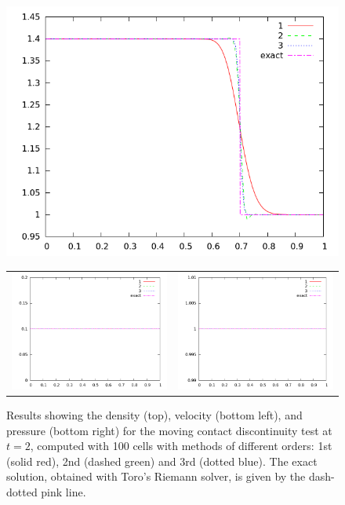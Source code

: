 \documentclass[10pt]{article}
\begin{document}
\begin{figure}[h]
  \begin{center}
     \includegraphics[width=.95\textwidth]{den_T8.png}
	\begin{tabular}{cc}
      \includegraphics[width=.475\textwidth]{vel_T8.png} &
	  \includegraphics[width=.475\textwidth]{prs_T8.png}
	\end{tabular}
  \end{center}
  \caption{Results showing the density (top), velocity (bottom left), and pressure (bottom right) for the moving contact discontinuity test at $t=2$, computed with 100 cells with methods of different orders: 1st (solid red), 2nd (dashed green) and 3rd (dotted blue). The exact solution, obtained with Toro's Riemann solver, is given by the dash-dotted pink line.}
  \label{fig:den_T8}
\end{figure}
\end{document}
